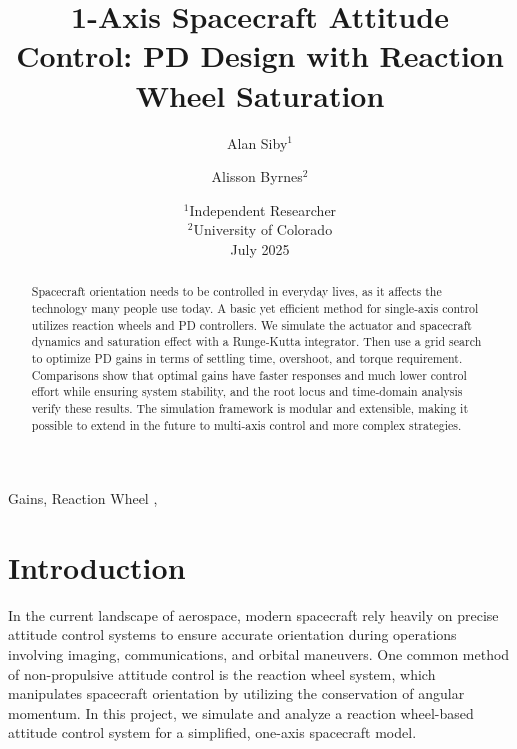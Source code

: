 \documentclass{ifacconf}
\begin{document}
\begin{frontmatter}

\title{1-Axis Spacecraft Attitude Control: PD Design with Reaction Wheel Saturation}

\author{Alan Siby$^{1}$ \and Alisson Byrnes$^{2}$}

\date{
    $^{1}$Independent Researcher \\
    $^{2}$University of Colorado \\
    July 2025
}

\address{Austin, TX, USA}




\begin{abstract}
Spacecraft orientation needs to be controlled in everyday lives, as it affects the technology many people use today. A basic yet efficient method for single-axis control utilizes reaction wheels and PD controllers. We simulate the actuator and spacecraft dynamics and saturation effect with a Runge-Kutta integrator. Then use a grid search to optimize PD gains in terms of settling time, overshoot, and torque requirement. Comparisons show that optimal gains have faster responses and much lower control effort while ensuring system stability, and the root locus and time-domain analysis verify these results. The simulation framework is modular and extensible, making it possible to extend in the future to multi-axis control and more complex strategies.
\end{abstract}



\begin{keyword}
Gains, Reaction Wheel \sep
\end{keyword}

\end{frontmatter}

\section{Introduction}
In the current landscape of aerospace, modern spacecraft rely heavily on precise attitude control systems to ensure accurate orientation during operations involving imaging, communications, and orbital maneuvers. One common method of non-propulsive attitude control is the reaction wheel system, which manipulates spacecraft orientation by utilizing the conservation of angular momentum. In this project, we simulate and analyze a reaction wheel-based attitude control system for a simplified, one-axis spacecraft model.
\end{document}
